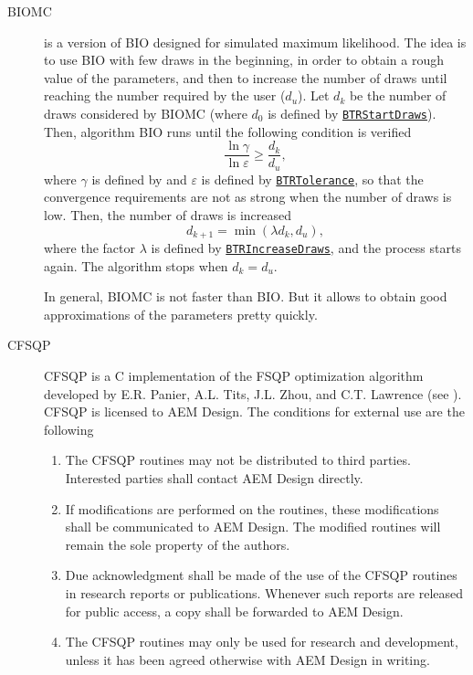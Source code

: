\documentclass[12pt]{memoir}
\begin{document}
\begin{description}
       \item[BIOMC ] is a version of BIO
         designed for simulated maximum likelihood. The idea is to use
         BIO with few draws in the beginning, in order to obtain a
         rough value of the parameters, and then to increase the
         number of draws until reaching the number required by the
         user ($d_u$). Let $d_k$ be the  number of draws considered by BIOMC
         (where $d_0$ is defined by \hyperlink{BTRStartDraws}{\texttt{BTRStartDraws}}). Then, algorithm BIO runs until the following condition is verified
         \[
            \frac{\ln \gamma}{\ln \varepsilon} \geq \frac{d_k}{d_u},
         \]
         where $\gamma$ is defined by  and $\varepsilon$ is defined by \hyperlink{BTRTolerance}{\texttt{BTRTolerance}}, so that the convergence requirements are not as strong when the number of draws is low. Then, the number of draws is increased
\[
d_{k+1} = \min(\lambda d_k,d_u),
\]
where the factor $\lambda$ is defined by \hyperlink{BTRIncreaseDraws}{\texttt{BTRIncreaseDraws}}, and the process starts again. The algorithm stops when $d_k=d_u$.
         
In general, BIOMC is not faster than BIO. But it allows to obtain good approximations of the parameters pretty quickly.

      \item[CFSQP] CFSQP
         is a C implementation of the FSQP optimization algorithm 
         developed by E.R. Panier, A.L. Tits, J.L. Zhou, and C.T. Lawrence (see
         \cite{LawrZhouTits97}). CFSQP is licensed to
         AEM Design. The conditions for
         external use are the following
         \begin{enumerate}
            \item The CFSQP routines may not be distributed to third parties.
                 Interested parties shall contact AEM Design directly.
            \item If modifications are performed on the routines, these
                 modifications shall be communicated to AEM Design.  The
                 modified routines will remain the sole property of the authors.
            \item Due acknowledgment shall be made of the use of the CFSQP
                 routines in research reports or publications. Whenever
                 such reports are released for public access, a copy shall
                 be forwarded to AEM Design.
            \item The CFSQP routines may only be used for research and
                 development, unless it has been agreed otherwise with AEM
                 Design in writing.
         \end{enumerate}


\end{description}
\end{document}
